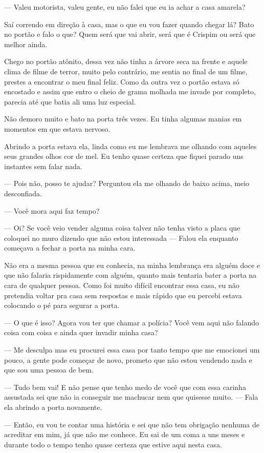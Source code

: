 — Valeu motorista, valeu gente, eu não falei que eu ia achar a casa amarela?

Saí correndo em direção à casa, mas o que eu vou fazer quando chegar lá? Bato no portão e falo o que? Quem será que vai abrir, será que é Crispim ou será que melhor ainda.

Chego no portão atônito, dessa vez não tinha a árvore seca na frente e aquele clima de filme de terror, muito pelo contrário, me sentia no final de um filme, prestes a encontrar o meu final feliz. Como da outra vez o portão estava só encostado e assim que entro o cheio de grama molhada me invade por completo, parecia até que batia ali uma luz especial.

Não demoro muito e bato na porta três vezes. Eu tinha algumas manias em momentos em que estava nervoso.

Abrindo a porta estava ela, linda como eu me lembrava me olhando com aqueles seus grandes olhos cor de mel. Eu tenho quase certeza que fiquei parado uns instantes sem falar nada.

— Pois não, posso te ajudar? Perguntou ela me olhando de baixo acima, meio desconfiada.

— Você mora aqui faz tempo?

— Oi? Se você veio vender alguma coisa talvez não tenha visto a placa que coloquei no muro dizendo que não estou interessada — Falou ela enquanto começava a fechar a porta na minha cara.

Não era a mesma pessoa que eu conhecia, na minha lembrança era alguém doce e que não falaria rispidamente com alguém, quanto mais tentaria bater a porta na cara de qualquer pessoa. Como foi muito difícil encontrar essa casa, eu não pretendia voltar pra casa sem respostas e mais rápido que eu percebi estava colocando o pé para segurar a porta.

— O que é isso? Agora vou ter que chamar a polícia? Você vem aqui não falando coisa com coisa e ainda quer invadir minha casa?

— Me desculpa mas eu procurei essa casa por tanto tempo que me emocionei um pouco, a gente pode começar de novo, prometo que não estou vendendo nada e que sou uma pessoa de bem.

— Tudo bem vai! E não pense que tenho medo de você que com essa carinha assustada sei que não ia conseguir me machucar nem que quisesse muito. — Fala ela abrindo a porta novamente.

— Então, eu vou te contar uma história e sei que não tem obrigação nenhuma de acreditar em mim, já que não me conhece. Eu sai de um coma a uns meses e durante todo o tempo tenho quase certeza que estive aqui nesta casa.

